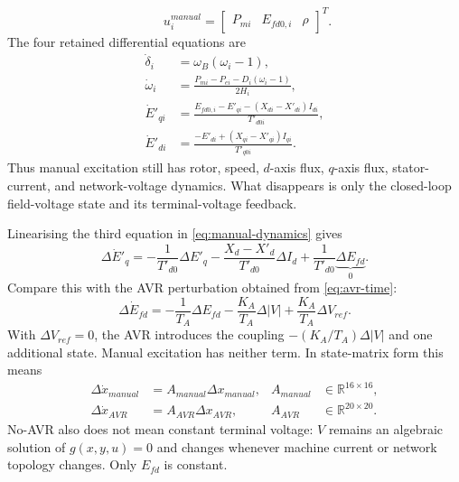 \documentclass[12pt,a4paper]{article}
\begin{document}
\begin{itemize}
\begin{equation}
  \qquad
  u_i^{manual}=
  \begin{bmatrix}P_{mi}&E_{fd0,i}&\rho\end{bmatrix}^{T}.
  \label{eq:manual-state-input}
  \end{equation}
  The four retained differential equations are
  \begin{align}
  \dot\delta_i&=\omega_B(\omega_i-1),\\
  \dot\omega_i&=
  \frac{P_{mi}-P_{ei}-D_i(\omega_i-1)}{2H_i},\\
  \dot E'_{qi}&=
  \frac{E_{fd0,i}-E'_{qi}-(X_{di}-X'_{di})I_{di}}{T'_{d0i}},\\
  \dot E'_{di}&=
  \frac{-E'_{di}+(X_{qi}-X'_{qi})I_{qi}}{T'_{q0i}}.
  \label{eq:manual-dynamics}
  \end{align}
  Thus manual excitation still has rotor, speed, $d$-axis flux, $q$-axis
  flux, stator-current, and network-voltage dynamics. What disappears is only
  the closed-loop field-voltage state and its terminal-voltage feedback.

  Linearising the third equation in \eqref{eq:manual-dynamics} gives
  \begin{equation}
  \Delta\dot E'_q=
  -\frac{1}{T'_{d0}}\Delta E'_q
  -\frac{X_d-X'_d}{T'_{d0}}\Delta I_d
  +\frac{1}{T'_{d0}}\underbrace{\Delta E_{fd}}_{0}.
  \label{eq:manual-linear-field}
  \end{equation}
  Compare this with the AVR perturbation obtained from
  \eqref{eq:avr-time}:
  \begin{equation}
  \Delta\dot E_{fd}
  =-\frac{1}{T_A}\Delta E_{fd}
   -\frac{K_A}{T_A}\Delta|V|
   +\frac{K_A}{T_A}\Delta V_{ref}.
  \label{eq:avr-linear-field}
  \end{equation}
  With $\Delta V_{ref}=0$, the AVR introduces the coupling
  $-(K_A/T_A)\Delta|V|$ and one additional state. Manual excitation has
  neither term. In state-matrix form this means
  \begin{equation}
  \begin{aligned}
  \Delta\dot x_{manual}&=A_{manual}\Delta x_{manual},
  &A_{manual}&\in\mathbb{R}^{16\times16},\\
  \Delta\dot x_{AVR}&=A_{AVR}\Delta x_{AVR},
  &A_{AVR}&\in\mathbb{R}^{20\times20}.
  \end{aligned}
  \end{equation}
  No-AVR also does not mean constant terminal voltage: $V$ remains an
  algebraic solution of $g(x,y,u)=0$ and changes whenever machine current or
  network topology changes. Only $E_{fd}$ is constant.


\end{itemize}
\end{document}
